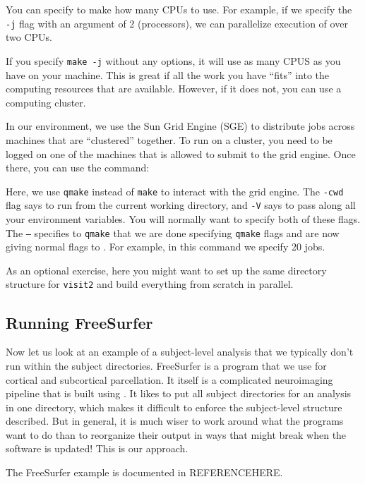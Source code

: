 You can specify to make how many CPUs to use. For example, if we specify the \texttt{ -j} flag with an argument of 2 (processors), we can parallelize execution of \maken{} over two CPUs. 

If you specify \texttt{make -j} without any options, it will use as many CPUS as  you have on your machine. This is great if all the work you have ``fits'' into the computing resources that are available. However, if it does not, you can use a computing cluster.

In our environment, we use the Sun Grid Engine (SGE) to distribute jobs across machines that are ``clustered'' together. To run on a cluster, you need to be logged on one of the machines that is allowed to submit to the grid engine.  Once there, you can use the command:

Here, we use \texttt{qmake} instead of \texttt{make} to interact with the grid engine. The \texttt{-cwd} flag says to run from the current working directory, and \texttt{-V} says to pass along all your environment variables. You will normally want to specify both of these flags. The \texttt{--} specifies to \texttt{qmake} that we are done specifying \texttt{qmake} flags and are now giving normal flags to \maken{}. For example, in this command we specify 20 jobs. 

As an optional exercise, here you might want to set up the same directory structure for \texttt{visit2} and build everything from scratch in parallel.

\subsection{Running FreeSurfer}
Now let us look at an example of a subject-level analysis that we typically don't run within the subject directories. FreeSurfer is a program that we use for cortical and subcortical parcellation. It itself is a complicated neuroimaging pipeline that is built using \maken{}. It likes to put all subject directories for an analysis in one directory, which makes it difficult to enforce the subject-level structure described. But in general, it is much wiser to work around what the programs want to do than to reorganize their output in ways that might break when the software is updated! This is our approach.

The FreeSurfer example is documented in REFERENCEHERE.

